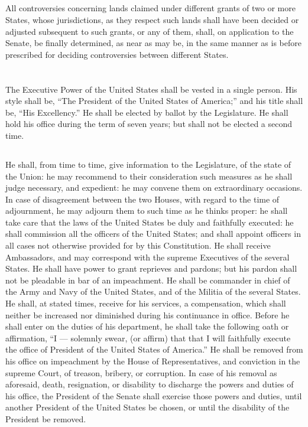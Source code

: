 \documentclass{constitution}
\begin{document}
\section{}
All controversies concerning lands claimed under different grants of two or more States,
whose jurisdictions, as they respect such lands shall have been decided or adjusted subsequent to such grants, or any of them,
shall, on application to the Senate, be finally determined, as near as may be, in the same manner as is before prescribed for deciding controversies between different States.

\chapter{}
\section{}
The Executive Power of the United States shall be vested in a single person.
His style shall be, “The President of the United States of America;”
and his title shall be, “His Excellency.”
He shall be elected by ballot by the Legislature.
He shall hold his office during the term of seven years;
but shall not be elected a second time.

\section{}
He shall, from time to time, give information to the Legislature, of the state of the Union:
he may recommend to their consideration such measures as he shall judge necessary, and expedient:
he may convene them on extraordinary occasions.
In case of disagreement between the two Houses, with regard to the time of adjournment, he may adjourn them to such time as he thinks proper:
he shall take care that the laws of the United States be duly and faithfully executed:
he shall commission all the officers of the United States;
and shall appoint officers in all cases not otherwise provided for by this Constitution.
He shall receive Ambassadors, and may correspond with the supreme Executives of the several States.
He shall have power to grant reprieves and pardons;
but his pardon shall not be pleadable in bar of an impeachment.
He shall be commander in chief of the Army and Navy of the United States, and of the Militia of the several States.
He shall, at stated times, receive for his services, a compensation,
which shall neither be increased nor diminished during his continuance in office.
Before he shall enter on the duties of his department, he shall take the following oath or affirmation,
“I — solemnly swear, (or affirm) that that I will faithfully execute the office of President of the United States of America.”
He shall be removed from his office on impeachment by the House of Representatives, and conviction in the supreme Court, of treason, bribery, or corruption.
In case of his removal as aforesaid, death, resignation, or disability to discharge the powers and duties of his office, the President of the Senate shall exercise those powers and duties, until another President of the United States be chosen, or until the disability of the President be removed.
\end{document}

